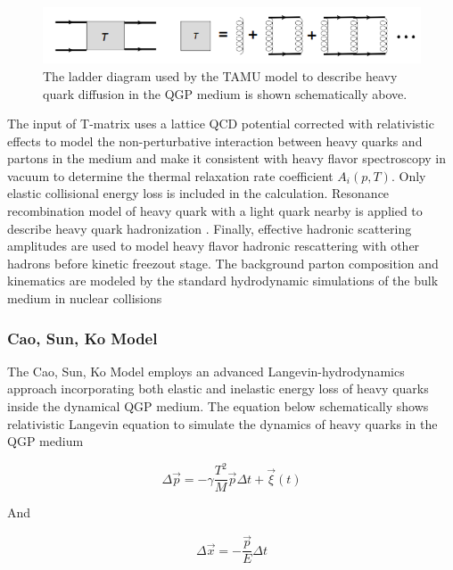  \begin{figure}[hbtp]
\begin{center}
\includegraphics[width=1.0\textwidth]{Figures/Chapter1/LadderDiagram.png}
\caption{The ladder diagram used by the TAMU model to describe heavy quark diffusion in the QGP medium is shown schematically above.}
\label{LadderDiagram}
\end{center}
\end{figure}  

The input of T-matrix uses a lattice QCD potential \cite{LQCDTAMU} corrected with relativistic effects to model the non-perturbative interaction between heavy quarks and partons in the medium and make it consistent with heavy flavor spectroscopy in vacuum to determine the thermal relaxation rate coefficient $A_i(p,T)$. Only elastic collisional energy loss is included in the calculation. Resonance recombination model of heavy quark with a light quark nearby is applied to describe heavy quark hadronization \cite{RRM1}. Finally, effective hadronic scattering amplitudes are used to model heavy flavor hadronic rescattering with other hadrons before kinetic freezout stage. The background parton composition and kinematics are modeled by the standard hydrodynamic simulations of the bulk medium in nuclear collisions

\subsubsection{Cao, Sun, Ko Model}

The Cao, Sun, Ko Model employs an advanced Langevin-hydrodynamics approach \cite{CaoLH1,CaoLH2} incorporating both elastic and inelastic energy loss of heavy quarks inside the dynamical QGP medium. The equation below schematically shows relativistic Langevin equation to simulate the dynamics of heavy quarks in the QGP medium


\begin{equation}
\Delta \vec{p} = - \gamma \frac{T^2}{M} \vec{p} \Delta t + \vec{\xi}(t) 
\end{equation}

And

\begin{equation}
\Delta \vec{x} = - \frac{\vec{p}}{E} \Delta t
\end{equation}

